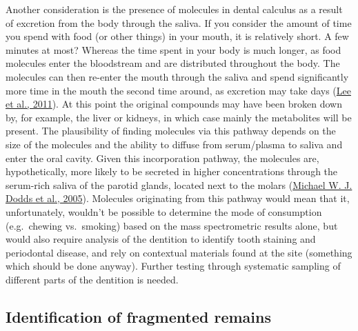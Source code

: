 \documentclass[
  letterpaper,
]{book}
\begin{document}
Another consideration is the presence of molecules in dental calculus as
a result of excretion from the body through the saliva. If you consider
the amount of time you spend with food (or other things) in your mouth,
it is relatively short. A few minutes at most? Whereas the time spent in
your body is much longer, as food molecules enter the bloodstream and
are distributed throughout the body. The molecules can then re-enter the
mouth through the saliva and spend significantly more time in the mouth
the second time around, as excretion may take days
(\protect\hyperlink{ref-leeOralFluid2011}{Lee et al., 2011}). At this
point the original compounds may have been broken down by, for example,
the liver or kidneys, in which case mainly the metabolites will be
present. The plausibility of finding molecules via this pathway depends
on the size of the molecules and the ability to diffuse from
serum/plasma to saliva and enter the oral cavity. Given this
incorporation pathway, the molecules are, hypothetically, more likely to
be secreted in higher concentrations through the serum-rich saliva of
the parotid glands, located next to the molars
(\protect\hyperlink{ref-doddsHealthBenefits2005}{Michael W. J. Dodds et
al., 2005}). Molecules originating from this pathway would mean that it,
unfortunately, wouldn't be possible to determine the mode of consumption
(e.g.~chewing vs.~smoking) based on the mass spectrometric results
alone, but would also require analysis of the dentition to identify
tooth staining and periodontal disease, and rely on contextual materials
found at the site (something which should be done anyway). Further
testing through systematic sampling of different parts of the dentition
is needed.

\hypertarget{identification-of-fragmented-remains}{%
\subsection{Identification of fragmented
remains}\label{identification-of-fragmented-remains}}
\end{document}
